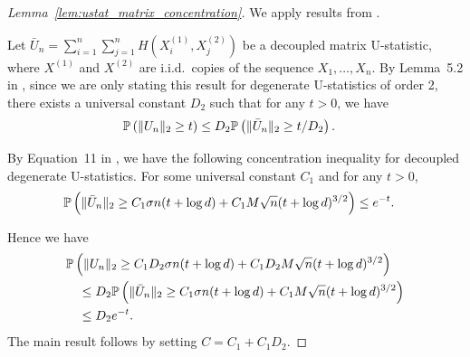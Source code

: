 \begin{proof}[Lemma~\ref{lem:ustat_matrix_concentration}]

  We apply results from \citet{minsker2019moment}.


  Let $\bar U_n = \sum_{i=1}^n \sum_{j=1}^n H(X_i^{(1)}, X_j^{(2)})$
  be a decoupled matrix U-statistic,
  where $X^{(1)}$ and $X^{(2)}$
  are i.i.d.\ copies of the sequence $X_1, \ldots, X_n$.
  By Lemma~5.2 in \citet{minsker2019moment},
  since we are only stating this result for
  degenerate U-statistics of order 2,
  there exists a universal constant $D_2$
  such that for any $t > 0$,
  we have
  \begin{align*}
    \P\left(
      \|U_n\|_2 \geq t
    \right)
    &\leq
    D_2
    \P\left(
      \|\bar U_n\|_2 \geq t / D_2
    \right).
  \end{align*}


  By Equation~11 in \citet{minsker2019moment},
  we have the following concentration inequality
  for decoupled degenerate U-statistics.
  For some universal constant $C_1$
  and for any $t > 0$,
  \begin{align*}
    \P\left(
      \|\bar U_n\|_2
      \geq
      C_1 \sigma n (t + \log d)
      + C_1 M \sqrt{n} (t + \log d)^{3/2}
    \right)
    &\leq
    e^{-t}.
  \end{align*}


  Hence we have
  \begin{align*}
    &\P\left(
      \|U_n\|_2
      \geq
      C_1 D_2 \sigma n (t + \log d)
      + C_1 D_2 M \sqrt{n} (t + \log d)^{3/2}
    \right) \\
    &\quad\leq
    D_2 \P\left(
      \|\bar U_n\|_2
      \geq
      C_1 \sigma n (t + \log d)
      + C_1 M \sqrt{n} (t + \log d)^{3/2}
    \right) \\
    &\quad\leq
    D_2 e^{-t}.
  \end{align*}
  The main result follows by setting
  $C = C_1 + C_1 D_2$.



\end{proof}
